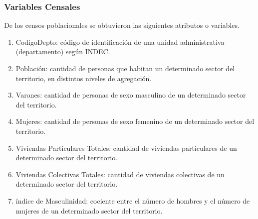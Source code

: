 \documentclass{article}
\theoremstyle{mytheoremstyle}
\theoremstyle{mytheoremstyle}
\theoremstyle{myproblemstyle}
\begin{document}
\subsubsection{Variables Censales}
 De los censos poblacionales se obtuvieron las siguientes atributos o variables.
 \begin{enumerate}
  \item CodigoDepto: código de identificación de una unidad administrativa (departamento) según INDEC.
  \item Población: cantidad de personas que habitan un determinado sector del territorio, en distintos niveles de agregación.
  \item Varones: cantidad de personas de sexo masculino de un determinado sector del territorio. 
  \item Mujeres: cantidad de personas de sexo femenino de un determinado sector del territorio.  
  \item Viviendas Particulares Totales: cantidad de viviendas particulares de un determinado sector del territorio. 
  \item Viviendas Colectivas Totales: cantidad de viviendas colectivas de un determinado sector del territorio. 
  \item índice de Masculinidad: cociente entre el número de hombres y el número de mujeres de un determinado sector del territorio.
 \end{enumerate} 
\end{document}
